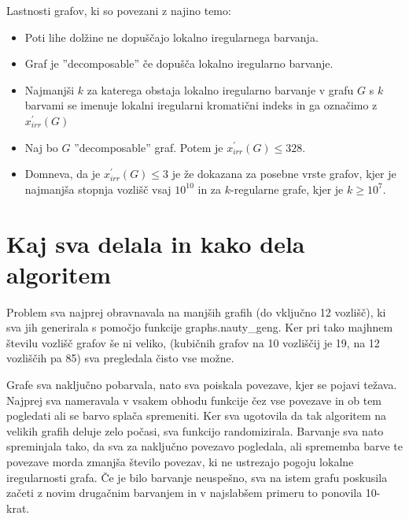 \documentclass[12pt, a4paper]{article}
\begin{document}
Lastnosti grafov, ki so povezani z najino temo:
\begin{itemize}

\item Poti lihe dolžine ne dopuščajo lokalno iregularnega barvanja.
\item Graf je ''decomposable'' če dopušča lokalno iregularno barvanje.
\item Najmanjši $k$ za katerega obstaja lokalno iregularno barvanje v grafu $G$ s $k$ barvami se imenuje lokalni iregularni kromatični indeks in ga označimo z $x^'_{irr}(G)$
\item Naj bo $G$ ''decomposable'' graf. Potem je $x^'_{irr}(G) \leq 328$.
\item Domneva, da je $x^'_{irr}(G) \leq 3$ je že dokazana za posebne vrste grafov, kjer je najmanjša stopnja vozlišč vsaj $10^{10}$ in za $k$-regularne grafe, kjer je $k \geq 10^7$.

\end{itemize}

\newpage
\section{Kaj sva delala in kako dela algoritem}\textit{}\textit{}

Problem sva najprej obravnavala na manjših graﬁh (do vključno 12 vozlišč), ki sva jih generirala s pomočjo funkcije graphs.nauty_geng. Ker pri tako majhnem številu vozlišč grafov še ni veliko, (kubičnih grafov na 10 vozliščij je 19, na 12 vozliščih pa 85) sva pregledala čisto vse možne.

Grafe sva naključno pobarvala, nato sva poiskala povezave, kjer se pojavi težava. Najprej sva nameravala v vsakem obhodu funkcije čez vse povezave in ob tem pogledati ali se barvo splača spremeniti. Ker sva ugotovila da tak algoritem na velikih grafih deluje zelo počasi, sva funkcijo randomizirala. Barvanje sva nato spreminjala tako, da sva za naključno  povezavo pogledala, ali sprememba barve te povezave morda zmanjša število povezav, ki ne ustrezajo pogoju lokalne iregularnosti grafa. Če je bilo barvanje neuspešno, sva na istem grafu poskusila začeti z novim drugačnim barvanjem in v najslabšem primeru to ponovila 10-krat.
\end{document}
